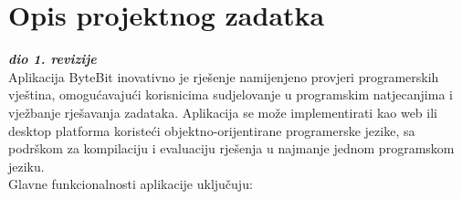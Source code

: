 \chapter{Opis projektnog zadatka}
		
		\textbf{\textit{dio 1. revizije}}\\
		
		Aplikacija ByteBit inovativno je rješenje namijenjeno provjeri 
		programerskih vještina, omogućavajući korisnicima sudjelovanje u 
		programskim natjecanjima i vježbanje rješavanja zadataka. Aplikacija 
		se može implementirati kao web ili desktop platforma koristeći 
		objektno-orijentirane programerske jezike, sa podrškom za kompilaciju
		i evaluaciju rješenja u najmanje jednom programskom jeziku.\\

		Glavne funkcionalnosti aplikacije uključuju:
